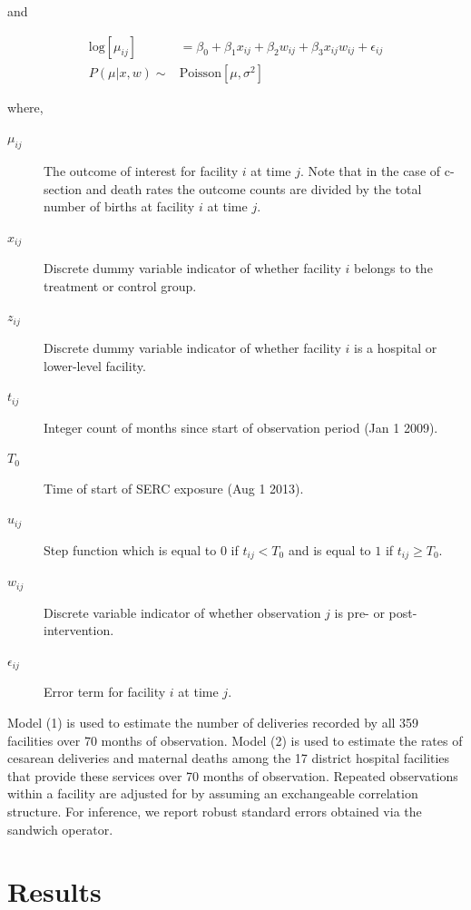 \documentclass[10pt]{article}
\begin{document}
and

\begin{align}
\textrm{log} [ \mu_{ij} ] &= \beta_{0} + \beta_{1} x_{ij} + \beta_{2} w_{ij} + \beta_{3} x_{ij} w_{ij} + \epsilon_{ij} \\
P(\mu | x,w) \sim & \textrm{Poisson} [ \mu, \sigma^2 ] \nonumber
\end{align}

where,

\begin{description}
\item[ $\mu_{ij}$ ] The outcome of interest for facility $i$ at time $j$. Note that in the case of c-section and death rates the outcome counts are divided by the total number of births at facility $i$ at time $j$. 
\item[ $x_{ij}$ ] Discrete dummy variable indicator of whether facility $i$ belongs to the treatment or control group.
\item[ $z_{ij}$ ] Discrete dummy variable indicator of whether facility $i$ is a hospital or lower-level facility.
\item[ $t_{ij}$ ] Integer count of months since start of observation period (Jan 1 2009).
\item[ $T_{0}$ ] Time of start of SERC exposure (Aug 1 2013).
\item[ $u_{ij}$ ] Step function which is equal to $0$ if $t_{ij} < T_{0}$ and is equal to $1$ if $t_{ij} \geq T_{0}$.
\item[ $w_{ij}$ ] Discrete variable indicator of whether observation $j$ is pre- or post-intervention.
\item[ $\epsilon_{ij}$ ] Error term for facility $i$ at time $j$. 
\end{description}

Model (1) is used to estimate the number of deliveries recorded by all
359 facilities over 70 months of observation. Model (2) is used to
estimate the rates of cesarean deliveries and maternal deaths among the
17 district hospital facilities that provide these services over 70
months of observation. Repeated observations within a facility are
adjusted for by assuming an exchangeable correlation structure. For
inference, we report robust standard errors obtained via the sandwich
operator.

\section{Results}\label{results}
\end{document}
